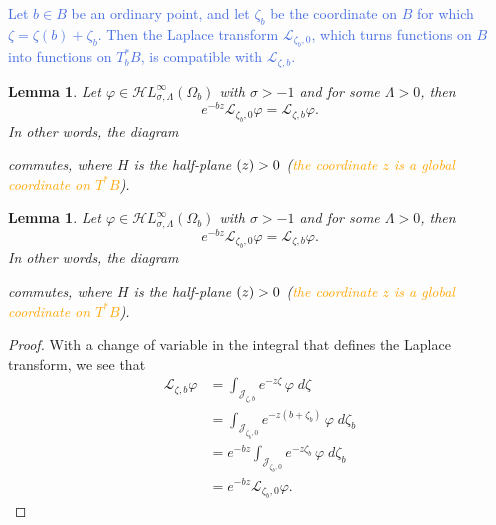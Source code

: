 \documentclass{article}
\let\Re\relax
\DeclareMathOperator{\Re}{Re}
\newcommand{\singexp}[2]{\mathcal{H}L^\infty_{#1, #2}}
\newcommand{\laplace}{\mathcal{L}}
\theoremstyle{definition}
\theoremstyle{plain}
\newtheorem{lemma}[definition]{Lemma}
\begin{document}
\textcolor{RoyalBlue}{Let $b \in B$ be an ordinary point, and let $\zeta_b$ be the coordinate on $B$ for which $\zeta = \zeta(b) + \zeta_b$. Then the Laplace transform $\laplace_{\zeta_b,0}$, which turns functions on $B$ into functions on $T^*_{b}B$, is compatible with $\laplace_{\zeta,b}$.}
\begin{lemma}%
Let $\varphi\in\singexp{\sigma}{\Lambda}(\Omega_b)$ with $\sigma>-1$ and for some $\Lambda>0$, then
   \begin{equation}
    \label{change-chart}
    e^{-bz} \laplace_{\zeta_b, 0} \varphi = \laplace_{\zeta, b} \varphi.
\end{equation}
In other words, the diagram
\begin{center}
\end{center}
commutes, where $H$ is the half-plane $\Re(z) > 0$ (\textcolor{orange}{the coordinate $z$ is a global coordinate on $T^*B$}).
\end{lemma}
\color{black}
\color{RoyalBlue}
\begin{lemma}%
Let $\varphi\in\singexp{\sigma}{\Lambda}(\Omega_b)$ with $\sigma>-1$ and for some $\Lambda>0$, then
   \begin{equation}
    \label{change-chart}
    e^{-bz} \laplace_{\zeta_b, 0} \varphi = \laplace_{\zeta, b} \varphi.
\end{equation}
In other words, the diagram
\begin{center}
\end{center}
commutes, where $H$ is the half-plane $\Re(z) > 0$ (\textcolor{orange}{the coordinate $z$ is a global coordinate on $T^*B$}).
\end{lemma}
\color{black}
\begin{proof}
With a change of variable in the integral that defines the Laplace transform, we see that
\begin{align*}
\laplace_{\zeta, b} \varphi & = \int_{\mathcal{J}_{\zeta,b}} e^{-z \zeta}\,\varphi\;d\zeta \\
& = \int_{\mathcal{J}_{\zeta_b,0}} e^{-z(b + \zeta_b)}\,\varphi\;d\zeta_b \\
& = e^{-b z} \int_{\mathcal{J}_{\zeta_b,0}} e^{-z\zeta_b}\,\varphi\;d\zeta_b \\
& = e^{-b z} \laplace_{\zeta_b, 0} \varphi.
\end{align*}
\end{proof}
\end{document}
